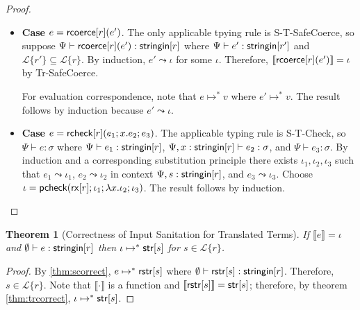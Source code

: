 \documentclass[11pt,leqno]{article}
\newtheorem{thm}{Theorem}
\theoremstyle{definition}
\newcommand{\Lagr}{\mathcal{L}}
\newcommand{\lang}[1]{\Lagr\{#1\}}
\newcommand{\coerce}[2]{ {\sf rcoerce}[#1](#2)}
\newcommand{\rcoerce}[2]{{\sf rcoerce}[#1](#2)}
\newcommand{\rcheck}[4]{ {\sf rcheck}[#1](#2;#3;#4) }
\newcommand{\stringin}[1]{{\sf stringin}[#1]}
\newcommand{\tcheck}[4]{{\sf pcheck}(#1; #2; #3; #4)}
\renewcommand{\tstr}[1]{{{\sf str}[#1]}}
\newcommand{\treplace}[3]{{\sf preplace}(#1;#2;#3)}
\newcommand{\rx}[1]{ {\sf rx}[#1] }
\newcommand{\lreplace}[3]{{\sf lreplace}(#1; #2; #3)}
\newcommand{\sctx}{\Psi} %
\newcommand{\trden}[1]{\llbracket #1 \rrbracket} %
\renewcommand{\lreplace}[3]{{\sf lreplace}(#1, #2, #3)}
\begin{document}
\begin{proof}
\begin{itemize}[label=$ $, itemsep=1ex]
For evaluation correspondence, note that $\trden{ \rstr{\lreplace{r}{s_1}{s_2}} } = \rstr{ \lreplace{r}{s_1}{s_2} }$ and
so it suffices to show that $\treplace{\rx{r}}{\iota_1}{\iota_2} \mapsto^* \rstr{r}{s_1}{s_2}$.
Note that $\lreplace{r}{e_1}{e_2} \mapsto^* \rstr{\lreplace{r}{s_1}{s_2}}$ 
where $e_1 \mapsto^* \rstr{s_1}$, $e_2 \mapsto^* \rstr{s_2}$, $r \mapsto^* r$.
By induction, $\iota_1 \mapsto^* \rstr{s_1}, \iota_2 \mapsto^* \rstr{s_2}$, and $\rx{r} \mapsto^* \rx{r}$.
So by S-E-Replace, the sufficient condition holds.

\item \textbf{Case $e = \rcoerce{r}{e'}$}.
The only applicable tpying rule is S-T-SafeCoerce, so suppose
$\sctx \vdash \rcoerce{r}{e'} : \stringin{r}$ where
$\sctx \vdash e' : \stringin{r'}$ and $\lang{r'} \subseteq \lang{r}$.
By induction, $e' \leadsto \iota$ for some $\iota$.
Therefore, $\trden{\coerce{r}{e'}} = \iota$ by Tr-SafeCoerce.

For evaluation correspondence, note that $e \mapsto^* v$ where
$e' \mapsto^* v$. The result follows by induction because $e' \leadsto \iota$. 

\item \textbf{Case $e = \rcheck{r}{e_1}{x.e_2}{e_3}$}.
The applicable typing rule is S-T-Check,
so $\sctx \vdash e : \sigma$ where 
$\sctx \vdash e_1 : \stringin{r}$,
$\sctx, x : \stringin{r} \vdash e_2 : \sigma$,
and $\sctx \vdash e_3 : \sigma$.
By induction and a corresponding substitution principle there exists $\iota_1, \iota_2, \iota_3$ such that
$e_1 \leadsto \iota_1$, 
$e_2 \leadsto \iota_2$ in context $\sctx, s : \stringin{r}$, and
$e_3 \leadsto \iota_3$.
Choose $\iota = \tcheck{\rx{r}}{\iota_1}{\lambda x . \iota_2}{\iota_3}$.
The result follows by induction.

\end{itemize}
\end{proof}

\begin{thm}[Correctness of Input Sanitation for Translated Terms]\label{thm:main}
  If $\trden{e} = \iota$ and $\emptyset \vdash e : \stringin{r}$ then $\iota \mapsto^* \tstr{s}$
  for $s \in \lang{r}$.
\end{thm}
\begin{proof}
  By \ref{thm:scorrect}, $e \mapsto^* {\sf rstr}[s]$ where $\emptyset \vdash \rstr{s} : \stringin{r}$. 
  Therefore, $s \in \lang{r}$.
  Note that $\trden{\cdot}$ is a function and $\trden{\rstr{s}} = \tstr{s}$; 
  therefore, by theorem \ref{thm:trcorrect}, $\iota \mapsto^* \tstr{s}$.
\end{proof}
\end{document}
